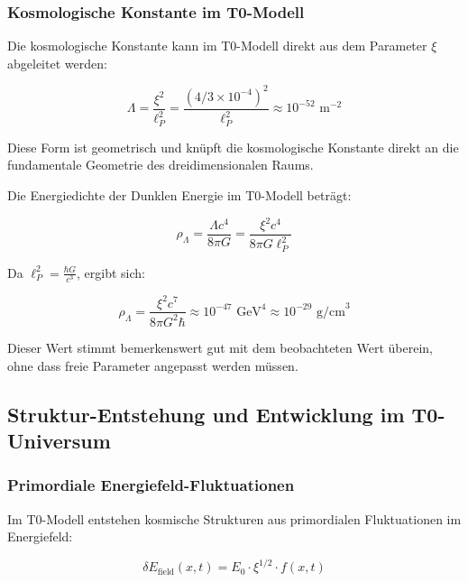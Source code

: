 \documentclass[12pt,a4paper]{article}
\theoremstyle{definition}
\begin{document}
\subsubsection{Kosmologische Konstante im T0-Modell}

Die kosmologische Konstante kann im T0-Modell direkt aus dem Parameter $\xi$ abgeleitet werden:

\begin{equation}
	\boxed{\Lambda = \frac{\xi^2}{\ell_P^2} = \frac{(4/3 \times 10^{-4})^2}{\ell_P^2} \approx 10^{-52} \text{ m}^{-2}}
\end{equation}

Diese Form ist geometrisch und knüpft die kosmologische Konstante direkt an die fundamentale Geometrie des dreidimensionalen Raums.

\begin{verhaltnis}
	Die Energiedichte der Dunklen Energie im T0-Modell beträgt:
	
	\begin{equation}
		\rho_\Lambda = \frac{\Lambda c^4}{8\pi G} = \frac{\xi^2 c^4}{8\pi G \ell_P^2}
	\end{equation}
	
	Da $\ell_P^2 = \frac{\hbar G}{c^3}$, ergibt sich:
	
	\begin{equation}
		\rho_\Lambda = \frac{\xi^2 c^7}{8\pi G^2 \hbar} \approx 10^{-47} \text{ GeV}^4 \approx 10^{-29} \text{ g/cm}^3
	\end{equation}
	
	Dieser Wert stimmt bemerkenswert gut mit dem beobachteten Wert überein, ohne dass freie Parameter angepasst werden müssen.
\end{verhaltnis}

\subsection{Struktur-Entstehung und Entwicklung im T0-Universum}

\subsubsection{Primordiale Energiefeld-Fluktuationen}

Im T0-Modell entstehen kosmische Strukturen aus primordialen Fluktuationen im Energiefeld:

\begin{equation}
	\delta E_{\text{field}}(x,t) = E_0 \cdot \xi^{1/2} \cdot f(x,t)
\end{equation}
\end{document}

